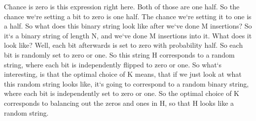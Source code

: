 Chance is zero is this expression right here.
Both of those are one half.
So the chance we`re setting a bit to zero is one half.
The chance we`re setting it to one is a half.
So what does this binary string look like after we`ve done M insertions? So it`s a binary string of length N, and we`ve done M insertions into it.
What does it look like? Well, each bit afterwards is set to zero with probability half.
So each bit is randomly set to zero or one.
So this string H corresponds to a random string, where each bit is independently flipped to zero or one.
So what`s interesting, is that the optimal choice of K means, that if we just look at what this random string looks like, it`s going to correspond to a random binary string, where each bit is independently set to zero or one.
So the optimal choice of K corresponds to balancing out the zeros and ones in H, so that H looks like a random string.

